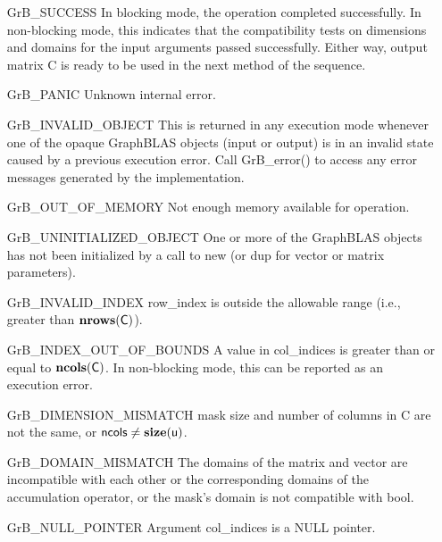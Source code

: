 \begin{itemize}[leftmargin=2.1in]
    \item[{\sf GrB\_SUCCESS}]         In blocking mode, the operation completed
    successfully. In non-blocking mode, this indicates that the compatibility 
    tests on dimensions and domains for the input arguments passed successfully. 
    Either way, output matrix {\sf C} is ready to be used in the next method of 
    the sequence.

    \item[{\sf GrB\_PANIC}]            Unknown internal error.

    \item[{\sf GrB\_INVALID\_OBJECT}] This is returned in any execution mode 
    whenever one of the opaque GraphBLAS objects (input or output) is in an invalid 
    state caused by a previous execution error.  Call {\sf GrB\_error()} to access 
    any error messages generated by the implementation.

    \item[{\sf GrB\_OUT\_OF\_MEMORY}]  Not enough memory available for operation.

    \item[{\sf GrB\_UNINITIALIZED\_OBJECT}] One or more of the GraphBLAS objects
    has not been initialized by a call to {\sf new} (or {\sf dup} for vector or
    matrix parameters).

    \item[{\sf GrB\_INVALID\_INDEX}]    {\sf row\_index} is outside the allowable 
    range (i.e., greater than $\bold{nrows}({\sf C})$).

    \item[{\sf GrB\_INDEX\_OUT\_OF\_BOUNDS}]  A value in {\sf col\_indices} 
    is greater than or equal to $\bold{ncols}({\sf C})$.  In 
    non-blocking mode, this can be reported as an execution error.

    \item[{\sf GrB\_DIMENSION\_MISMATCH}] {\sf mask} size and number of columns
    in {\sf C} are not the same, or ${\sf ncols} \neq \bold{size}({\sf u})$.

    \item[{\sf GrB\_DOMAIN\_MISMATCH}]     The domains of the matrix and vector
    are incompatible with each other or the corresponding domains of the 
    accumulation operator, or the mask's domain is not compatible with {\sf bool}.

    \item[{\sf GrB\_NULL\_POINTER}] Argument {\sf col\_indices} is a {\sf NULL} pointer.
\end{itemize}

